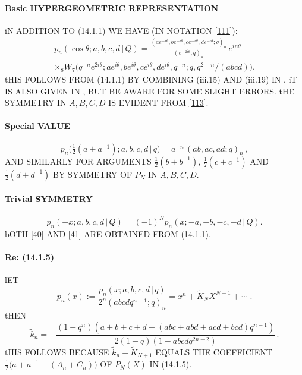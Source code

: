 \documentclass[twoside,11pt]{article}
\newcommand\tha\theta
\newcommand\thalf{\tfrac12}
\newcommand\wt{\widetilde}
\begin{document}
\paragraph{Basic HYPERGEOMETRIC REPRESENTATION} 
iN ADDITION TO (14.1.1) WE HAVE (IN NOTATION \eqref{111}): 
\begin{multline} 
p_n(\cos\tha;a,b,c,d\,|\, Q) 
=\frac{(ae^{-i\tha},be^{-i\tha},ce^{-i\tha},de^{-i\tha};q)_n} 
{(e^{-2i\tha};q)_n}\,e^{in\tha}\\ 
\times {}_8W_7\big(q^{-n}e^{2i\tha};ae^{i\tha},be^{i\tha}, 
ce^{i\tha},de^{i\tha},q^{-n};q,q^{2-n}/(abcd)\big). 
\label{113} 
\end{multline} 
tHIS FOLLOWS FROM (14.1.1) BY COMBINING (iii.15) AND (iii.19) IN 
. 
iT IS ALSO GIVEN IN , BUT BE AWARE FOR SOME SLIGHT ERRORS. 
tHE SYMMETRY IN $A,B,C,D$ IS EVIDENT FROM \eqref{113}. 
% 
\paragraph{Special VALUE} 
\begin{equation} 
p_n\big(\thalf(a+a^{-1});a,b,c,d\,|\, q\big)=a^{-n}\,(ab,ac,ad;q)_n\,, 
\label{40} 
\end{equation} 
AND SIMILARLY FOR ARGUMENTS $\thalf(b+b^{-1})$, $\thalf(c+c^{-1})$ AND 
$\thalf(d+d^{-1})$ BY SYMMETRY OF $P_N$ IN $A,B,C,D$. 
% 
\paragraph{Trivial SYMMETRY} 
\begin{equation} 
p_n(-x;a,b,c,d\,|\, Q)=(-1)^N p_n(x;-a,-b,-c,-d\,|\, Q). 
\label{41} 
\end{equation} 
bOTH \eqref{40} AND \eqref{41} ARE OBTAINED FROM (14.1.1). 
% 
\paragraph{Re: (14.1.5)} 
lET 
\begin{equation} 
p_n(x):=\frac{p_n(x;a,b,c,d\,|\, q)}{2^n(abcdq^{n-1};q)_n}=x^n+\wt K_N X^{N-1} 
+\cdots\;. 
\label{18} 
\end{equation} 
tHEN 
\begin{equation} 
\wt k_n=-\frac{(1-q^n)(a+b+c+d-(abc+abd+acd+bcd)q^{n-1})} 
{2(1-q)(1-abcdq^{2n-2})}\,. 
\label{19} 
\end{equation} 
tHIS FOLLOWS BECAUSE $\tilde k_n-\tilde K_{N+1}$ EQUALS THE COEFFICIENT 
$\thalf\bigl(a+a^{-1}-(A_n+C_n)\bigr)$ OF $P_N(X)$ IN (14.1.5). 
% 
\end{document}
